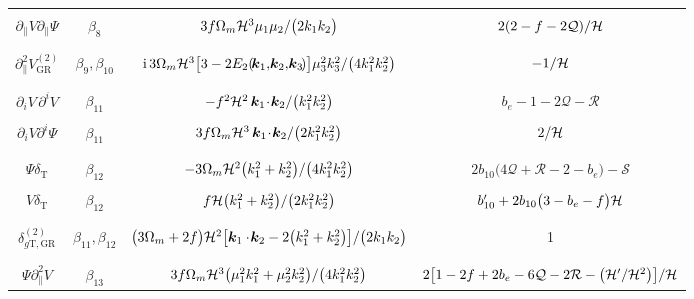 \begin{landscape}
\begin{longtable}{| c | c | c | c |}
&  &  & \\ 
$\partial_{\parallel}V\partial_{\parallel}\Psi$ & $\beta_{8}$ & ${3}f\Omega_{m}\mathcal{H}^{3}{\mu_{1}\mu_{2}/{\big(2k_{1}k_{2}\big)}}$ & ${2}(2-f-2\mathcal{Q})/{\mathcal{H}}$ \\
&  &  & \\ 
\hline
&  &  & \\ 
${\partial_{\parallel}^{2}V^{(2)}_{\mathrm{GR}}}$ & $\beta_{9},\beta_{10}$ & $\mathrm{i}\,3\Omega_{m}\mathcal{H}^{3}\big[3 -2 E_{2}(\!\bm{k}_{1},\!\bm{k}_{2},\!\bm{k}_{3}\!)\big]\mu_3^{2} k_3^{2}/\big(4k_{1}^{2}k_{2}^{2}\big)$ & $-1/\mathcal{H}$ \\
&  &  & \\ 
\hline
&  &  & \\ 
$\partial_{i}V\,\partial^{i}V$ & $\beta_{11}$ & $-f^{2}\mathcal{H}^{2}\,{\bm{k}_1\!\cdot\! \bm{k}_2}/{\big(k_{1}^{2}k_{2}^{2}\big)}$  & $ b_{e} -1- 2\mathcal{Q} - \mathcal{R}$ \\ 
&  &  & \\
$\partial_{i}V\partial^{i}\Psi$  &$\beta_{11}$ & $3f\Omega_{m}\mathcal{H}^{3} \,{\bm{k}_{1}\!\cdot\! \bm{k}_{2}}/{\big(2k_{1}^{2}k_{2}^{2}\big)} $ & ${2}/{\mathcal{H}}$  \\
&  &  & \\ 
\hline 
&  &  & \\
${\Psi\delta_{\mathrm{T}}}$ & $\beta_{12}$ &$-{3}\Omega_{m}\mathcal{H}^{2}{\big(k_{1}^{2}+k_{2}^{2}\big)}/{\big(4k_{1}^{2}k_{2}^{2}\big)} $& $2b_{10}\big(4\mathcal{Q}+\mathcal{R} -2-b_{e}\big) -{\mathcal{S}}$  \\ 
&  &  & \\
${V \delta_{\mathrm{T}}}$& $\beta_{12}$ & $f\mathcal{H}{\big(k_{1}^{2}+k_{2}^{2}\big)}/{\big(2k_{1}^{2}k_{2}^{2}\big)} $  & $b_{10}' + 2b_{10}\big(3-b_e-f\big)\mathcal{H}$ \\ 
&  &  & \\
\hline 
&  &  & \\
{$\delta^{(2)}_{{g \mathrm{T,GR}}}$}& ${\beta_{11},\beta_{12}}$ & {$\big(3\Omega_m+2f\big)\mathcal{H}^2\big[\bm{k}_{1}\cdot\!\bm{k}_{2}-2\big(k_1^2+k_2^2\big)\big]/\big(2k_{1}k_{2}\big)$} & 1 \\
&  &  & \\ 
\hline
&  &  & \\
$\Psi \partial^{2}_{\parallel}V$ & $\beta_{13}$ & ${3}f\Omega_{m}\mathcal{H}^{3}{\big(\mu_{1}^{2}k_{1}^{2} + \mu_{2}^{2}k_{2}^{2}\big)}/{\big(4k_{1}^{2}k_{2}^{2}\big)}$ &${2}\big[{1}-2f+2b_{e}-{6}\mathcal{Q}-2{\cal R}-\big({\mathcal{H}'}/{\mathcal{H}^{2}}\big)\big]/{\mathcal{H}}$ \\ 

\end{longtable}
\end{landscape}
